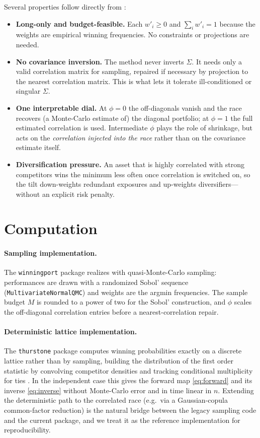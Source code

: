 \documentclass[11pt]{article}
\begin{document}
Several properties follow directly from :
\begin{itemize}
  \item \textbf{Long-only and budget-feasible.} Each $w'_i \ge 0$ and
        $\sum_i w'_i = 1$ because the weights are empirical winning frequencies.
        No constraints or projections are needed.
  \item \textbf{No covariance inversion.} The method never inverts $\Sigma$. It
        needs only a valid correlation matrix for sampling, repaired if
        necessary by projection to the nearest correlation matrix. This is what
        lets it tolerate ill-conditioned or singular $\Sigma$.
  \item \textbf{One interpretable dial.} At $\phi = 0$ the off-diagonals vanish
        and the race recovers (a Monte-Carlo estimate of) the diagonal portfolio;
        at $\phi = 1$ the full estimated correlation is used. Intermediate $\phi$
        plays the role of shrinkage, but acts on the \emph{correlation injected
        into the race} rather than on the covariance estimate itself.
  \item \textbf{Diversification pressure.} An asset that is highly correlated
        with strong competitors wins the minimum less often once correlation is
        switched on, so the tilt down-weights redundant exposures and up-weights
        diversifiers---without an explicit risk penalty.
\end{itemize}

\section{Computation}
\label{sec:computation}

\paragraph{Sampling implementation.}
The \texttt{winningport} package realizes  with quasi-Monte-Carlo
sampling: performances are drawn with a randomized Sobol' sequence
(\texttt{MultivariateNormalQMC}) and weights are the argmin frequencies. The
sample budget $M$ is rounded to a power of two for the Sobol' construction, and
$\phi$ scales the off-diagonal correlation entries before a
nearest-correlation repair.

\paragraph{Deterministic lattice implementation.}
The \texttt{thurstone} package computes winning probabilities exactly on a
discrete lattice rather than by sampling, building the distribution of the first
order statistic by convolving competitor densities and tracking conditional
multiplicity for ties \parencite{cotton2021}. In the independent case this gives
the forward map \eqref{eq:forward} and its inverse \eqref{eq:inverse} without
Monte-Carlo error and in time linear in $n$. Extending the deterministic path to
the correlated race (e.g.\ via a Gaussian-copula common-factor reduction) is the
natural bridge between the legacy sampling code and the current package, and we
treat it as the reference implementation for reproducibility.
\end{document}
